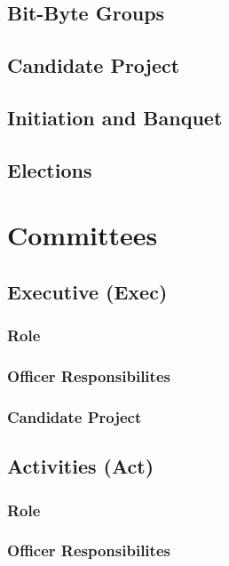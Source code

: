 \documentclass[11pt, article, oneside]{memoir}
\begin{document}
    \section{Bit-Byte Groups}
    \section{Candidate Project}
    \section{Initiation and Banquet}
    \section{Elections}



    \newpage
    \chapter{Committees}
    \section{Executive (Exec)}
    \subsection{Role}

    \subsection{Officer Responsibilites}

    \subsection{Candidate Project}

    \bigbreak



    \section{Activities (Act)}
    \subsection{Role}

    \subsection{Officer Responsibilites}
\end{document}
